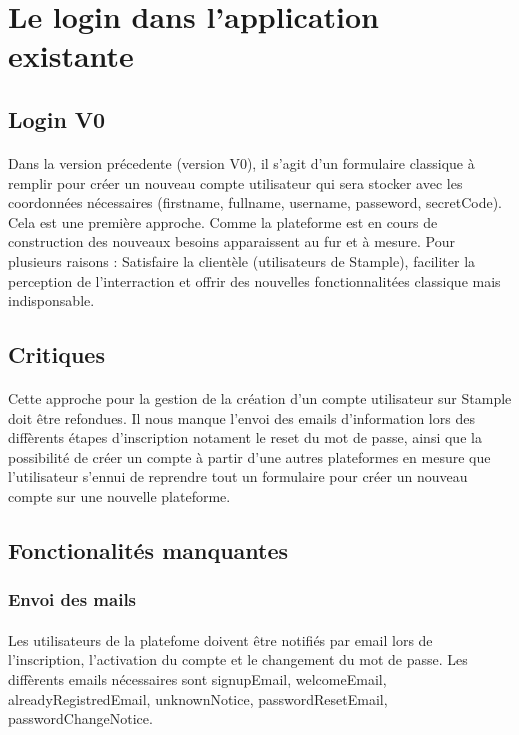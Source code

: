 \section{Le login dans l'application existante}
\subsection{Login V0}
\paragraph{}
Dans la version précedente (version V0), il s'agit d'un formulaire classique à remplir pour créer un nouveau compte utilisateur qui sera stocker avec les coordonnées nécessaires (firstname, fullname, username, passeword, secretCode).
Cela est une première approche. Comme la plateforme est en cours de construction des nouveaux besoins apparaissent au fur et à mesure.
Pour plusieurs raisons : Satisfaire la clientèle (utilisateurs de Stample), faciliter la perception de l'interraction et offrir des nouvelles fonctionnalitées classique mais indisponsable.  
\subsection{Critiques}
\paragraph{}
Cette approche pour la gestion de la création d'un compte utilisateur sur Stample doit être refondues.
Il nous manque l'envoi des emails d'information lors des diffèrents étapes d'inscription notament le reset du mot de passe, ainsi que la possibilité de créer un compte à partir d'une autres plateformes en mesure que l'utilisateur s'ennui de reprendre tout un formulaire pour créer un nouveau compte sur une nouvelle plateforme.
\subsection{Fonctionalités manquantes}
\subsubsection{Envoi des mails}
\paragraph{}
Les utilisateurs de la platefome doivent être notifiés par email lors de l'inscription, l'activation du compte et le changement du mot de passe. 
Les diffèrents emails nécessaires sont signupEmail, welcomeEmail, alreadyRegistredEmail, unknownNotice, passwordResetEmail, passwordChangeNotice.

